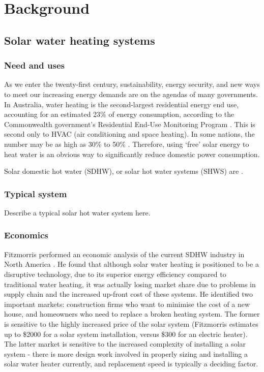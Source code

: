 \chapter{Background}

\section{Solar water heating systems}

\subsection{Need and uses}

As we enter the twenty-first century, sustainability, energy security, and new ways to meet our increasing energy demands are on the agendas of many governments.
In Australia, water heating is the second-largest residential energy end use, accounting for an estimated 23\% of energy consumption, according to the Commonwealth government's Residential End-Use Monitoring Program \cite{REMP12}.
This is second only to HVAC (air conditioning and space heating).
In some nations, the number may be as high as 30\% to 50\% \cite{Lane96}.
Therefore, using `free' solar energy to heat water is an obvious way to significantly reduce domestic power consumption.

Solar domestic hot water (SDHW), or solar hot water systems (SHWS) are .

\subsection{Typical system}

Describe a typical solar hot water system here.

\subsection{Economics}

Fitzmorris performed an economic analysis of the current SDHW industry in North America \cite{Fitzmorris10}.
He found that although solar water heating is positioned to be a disruptive technology, due to its superior energy efficiency compared to traditional water heating, it was actually losing market share due to problems in supply chain and the increased up-front cost of these systems.
He identified two important markets: construction firms who want to minimise the cost of a new house, and homeowners who need to replace a broken heating system.
The former is sensitive to the highly increased price of the solar system (Fitzmorris estimates up to \$2000 for a solar system installation, versus \$300 for an electric heater).
The latter market is sensitive to the increased complexity of installing a solar system - there is more design work involved in properly sizing and installing a solar water heater currently, and replacement speed is typically a deciding factor.

